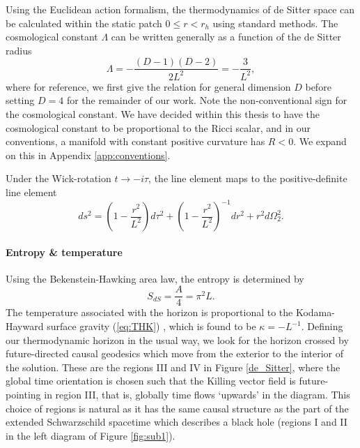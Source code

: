 Using the Euclidean action formalism, the thermodynamics of de Sitter space can be calculated within the static patch $0 \leq r<r_h$ using standard methods. The cosmological constant $\Lambda$ can be written generally as a function of the de Sitter radius
\begin{equation*}
    \Lambda = -\frac{(D-1)(D-2)}{2 L^2} = -\frac{3}{L^2},
\end{equation*}
where for reference, we first give the relation for general dimension $D$ before setting $D=4$ for the remainder of our work. Note the non-conventional sign for the cosmological constant. We have decided within this thesis to have the cosmological constant to be proportional to the Ricci scalar, and in our conventions, a manifold with constant positive curvature has $R < 0$. We expand on this in Appendix \ref{app:conventions}.

Under the Wick-rotation $t \rightarrow -i \tau$, the line element  maps to the positive-definite line element 
\begin{equation}
\label{eq:eucds}
    ds^2 = \left(1 - \frac{r^2}{L^2} \right) d\tau^2 + \left(1 - \frac{r^2}{L^2} \right)^{-1} dr^2 + r^2 d\Omega^2_2.
\end{equation}

\paragraph{Entropy \& temperature}

Using the Bekenstein-Hawking area law, the entropy is determined by
\begin{equation}
\label{eq:dsBH}
    S_{dS} = \frac{A}{4} = \pi^2 L.
\end{equation}
The temperature associated with the horizon is proportional to the Kodama-Hayward surface gravity (\ref{eq:THK}) , which is found to be $\kappa = -L^{-1}$. Defining our thermodynamic horizon in the usual way, we look for the horizon crossed by future-directed causal geodesics which move from the exterior to the interior of the solution. These are the regions III and IV in Figure \ref{de_Sitter}, where the global time orientation is chosen such that the Killing vector field is future-pointing in region III, that is, globally time flows `upwards' in the diagram. This choice of regions is natural as it has the same causal structure as the part of the extended Schwarzschild spacetime which describes a black hole (regions I and II in the left diagram of Figure \ref{fig:sub1}). 


